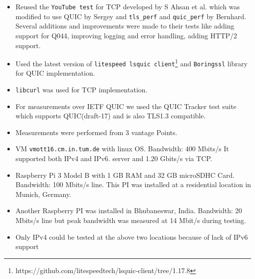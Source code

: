 \begin{frame}
\begin{itemize}
\itemsep3em 
\item Reused the \texttt{YouTube test} for TCP developed by S Ahsan et al.\cite{DBLP:conf/pam/AhsanBOS15} which was modified to use QUIC by Sergey\cite{sergey} and \texttt{tls\_perf} and \texttt{\texttt{quic\_perf}} by Bernhard\cite{bernhard}. Several additions and improvements were made to their tests like adding support for Q044, improving logging and error handling, adding HTTP/2 support.

\item Used the latest version of \texttt{litespeed lsquic client}\footnote[frame]{https://github.com/litespeedtech/lsquic-client/tree/1.17.8} and \texttt{Boringssl} library for QUIC implementation.

\item \texttt{libcurl} was used for TCP implementation.

\item For measurements over IETF QUIC we used the QUIC Tracker \cite{quic_tracker} test suite which supports QUIC(draft-17) and is also TLS1.3 compatible.

%
%
\end{itemize}
\end{frame}
\clearpage

\begin{frame}
\begin{itemize}
\itemsep3em
\item Measurements were performed from 3 vantage Points.  

\item VM \texttt{vmott16.cm.in.tum.de} with linux OS. Bandwidth: 400 Mbits/s
It supported both IPv4 and IPv6.
server and 1.20 Gbits/s via TCP. 

\item Raspberry Pi 3 Model B with 1 GB RAM and 32 GB microSDHC Card. Bandwidth: 100 Mbits/s line. This PI was installed at a residential location in Munich, Germany.

\item Another Raspberry PI was installed in Bhubaneswar, India. Bandwidth: 20 Mbits/s line but peak bandwidth was measured at 14 Mbit/s during testing. 

\item Only IPv4 could be tested at the above two locations because of lack of IPv6 support

\end{itemize}
\end{frame}
\clearpage

